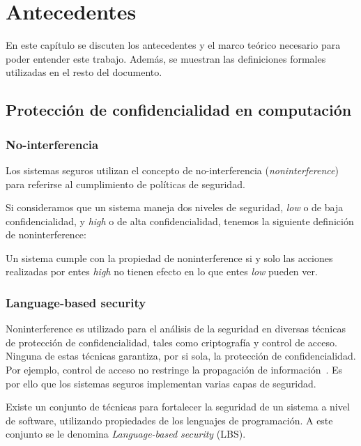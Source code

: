 \chapter{Antecedentes}

En este capítulo se discuten los antecedentes y el marco teórico necesario para poder entender este trabajo. Además, se muestran las definiciones formales utilizadas en el resto del documento.

\section{Protección de confidencialidad en computación}

\subsection{No-interferencia}
Los sistemas seguros utilizan el concepto de no-interferencia (\textit{noninterference})~\cite{noninterference} para referirse al cumplimiento de políticas de seguridad.

Si consideramos que un sistema maneja dos niveles de seguridad, \textit{low} o de baja confidencialidad, y \textit{high} o de alta confidencialidad, tenemos la siguiente definición de noninterference:

\begin{defn}[Noninterference]
  Un sistema cumple con la propiedad de noninterference si y solo las acciones realizadas por entes \textit{high} no tienen efecto en lo que entes \textit{low} pueden ver.
\end{defn}

\subsection{Language-based security}
Noninterference es utilizado para el análisis de la seguridad en diversas técnicas de protección de confidencialidad, tales como criptografía y control de acceso. Ninguna de estas técnicas garantiza, por si sola, la protección de confidencialidad. Por ejemplo, control de acceso no restringe la propagación de información~\cite{myers-phd}. Es por ello que los sistemas seguros implementan varias capas de seguridad.

Existe un conjunto de técnicas para fortalecer la seguridad de un sistema a nivel de software, utilizando propiedades de los lenguajes de programación. A este conjunto se le denomina \textit{Language-based security} (LBS).

